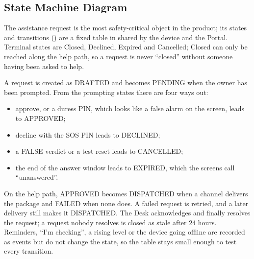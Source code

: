 \subsection{State Machine Diagram}
The assistance request is the most safety-critical object in the product; its states and transitions () are a fixed table in  shared by the device and the Portal. Terminal states are Closed, Declined, Expired and Cancelled; Closed can only be reached along the help path, so a request is never ``closed'' without someone having been asked to help.

A request is created as DRAFTED and becomes PENDING when the owner has been prompted. From the prompting states there are four ways out:
\begin{itemize}
\item approve, or a duress PIN, which looks like a false alarm on the screen, leads to APPROVED;
\item decline with the SOS PIN leads to DECLINED;
\item a FALSE verdict or a test reset leads to CANCELLED;
\item the end of the answer window leads to EXPIRED, which the screens call ``unanswered''.
\end{itemize}
On the help path, APPROVED becomes DISPATCHED when a channel delivers the package and FAILED when none does. A failed request is retried, and a later delivery still makes it DISPATCHED. The Desk acknowledges and finally resolves the request; a request nobody resolves is closed as stale after 24 hours. Reminders, ``I'm checking'', a rising level or the device going offline are recorded as events but do not change the state, so the table stays small enough to test every transition.

